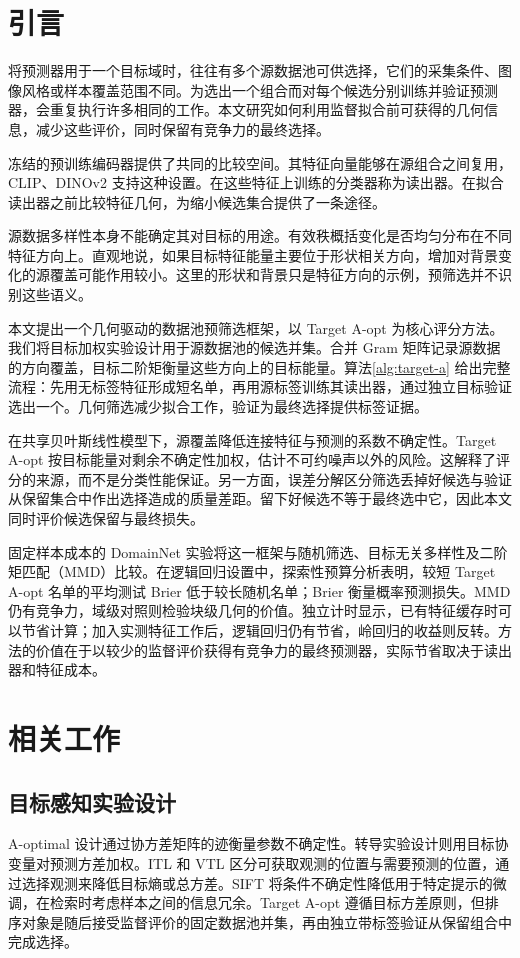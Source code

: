 \section{引言}
将预测器用于一个目标域时，往往有多个源数据池可供选择，它们的采集条件、图像风格或样本覆盖范围不同。为选出一个组合而对每个候选分别训练并验证预测器，会重复执行许多相同的工作。本文研究如何利用监督拟合前可获得的几何信息，减少这些评价，同时保留有竞争力的最终选择。

冻结的预训练编码器提供了共同的比较空间。其特征向量能够在源组合之间复用，CLIP、DINOv2 支持这种设置\citep{radford2021,oquab2024}。在这些特征上训练的分类器称为读出器。在拟合读出器之前比较特征几何，为缩小候选集合提供了一条途径。

源数据多样性本身不能确定其对目标的用途。有效秩概括变化是否均匀分布在不同特征方向上\citep{roy2007,garrido2023rankme}。直观地说，如果目标特征能量主要位于形状相关方向，增加对背景变化的源覆盖可能作用较小。这里的形状和背景只是特征方向的示例，预筛选并不识别这些语义。

本文提出一个几何驱动的数据池预筛选框架，以 Target A-opt 为核心评分方法。我们将目标加权实验设计\citep{yu2006,hubotter2024transductive}用于源数据池的候选并集。合并 Gram 矩阵记录源数据的方向覆盖，目标二阶矩衡量这些方向上的目标能量。算法\ref{alg:target-a} 给出完整流程：先用无标签特征形成短名单，再用源标签训练其读出器，通过独立目标验证选出一个。几何筛选减少拟合工作，验证为最终选择提供标签证据。

在共享贝叶斯线性模型下，源覆盖降低连接特征与预测的系数不确定性。Target A-opt 按目标能量对剩余不确定性加权，估计不可约噪声以外的风险。这解释了评分的来源，而不是分类性能保证。另一方面，误差分解区分筛选丢掉好候选与验证从保留集合中作出选择造成的质量差距。留下好候选不等于最终选中它，因此本文同时评价候选保留与最终损失。

固定样本成本的 DomainNet 实验将这一框架与随机筛选、目标无关多样性及二阶矩匹配（MMD）比较。在逻辑回归设置中，探索性预算分析表明，较短 Target A-opt 名单的平均测试 Brier 低于较长随机名单；Brier 衡量概率预测损失。MMD 仍有竞争力，域级对照则检验块级几何的价值。独立计时显示，已有特征缓存时可以节省计算；加入实测特征工作后，逻辑回归仍有节省，岭回归的收益则反转。方法的价值在于以较少的监督评价获得有竞争力的最终预测器，实际节省取决于读出器和特征成本。

\section{相关工作}
\subsection{目标感知实验设计}
A-optimal 设计通过协方差矩阵的迹衡量参数不确定性\citep{fontaine2021}。转导实验设计则用目标协变量对预测方差加权\citep{yu2006}。ITL 和 VTL 区分可获取观测的位置与需要预测的位置，通过选择观测来降低目标熵或总方差\citep{hubotter2024transductive}。SIFT 将条件不确定性降低用于特定提示的微调，在检索时考虑样本之间的信息冗余\citep{hubotter2025sift}。Target A-opt 遵循目标方差原则，但排序对象是随后接受监督评价的固定数据池并集，再由独立带标签验证从保留组合中完成选择。

